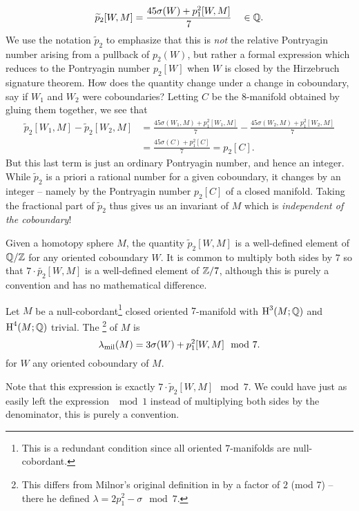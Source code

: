 \[
\widetilde{p}_2[W, M] = \frac{45\sigma(W) + p_1^2[W, M]}{7} \quad\in\mathbb{Q}.
\]
We use the notation $\widetilde{p}_2$ to emphasize that this is \emph{not} the relative Pontryagin number arising from a pullback of $p_2(W)$, but rather a formal expression which reduces to the Pontryagin number $p_2[W]$ when $W$ is closed by the Hirzebruch signature theorem.
How does the quantity change under a change in coboundary, say if $W_1$ and $W_2$ were coboundaries? Letting $C$ be the $8$-manifold obtained by gluing them together, we see that
\[
	\begin{aligned}
	\widetilde{p}_2[W_1,M] - \widetilde{p}_2[W_2,M]
		 & = \frac{45\sigma(W_1,M) + p_1^2[W_1,M]}{7} - \frac{45\sigma(W_2, M) + p_1^2[W_2,M]}{7} \\
		 & =\frac{45\sigma(C) + p_1^2[C]}{7} = p_2[C].
	\end{aligned}
\]
But this last term is just an ordinary Pontryagin number, and hence an integer. While $\widetilde{p}_2$ is a priori a rational number for a given coboundary, it changes by an integer -- namely by the Pontryagin number $p_2[C]$ of a closed manifold.
Taking the fractional part of $\widetilde{p}_2$ thus gives us an invariant of $M$ which is \emph{independent of the coboundary}!

\begin{remark*}
Given a homotopy sphere $M$, the quantity $\widetilde{p}_2[W,M]$ is a well-defined element of $\mathbb{Q}/\mathbb{Z}$ for any oriented coboundary $W$. It is common to multiply both sides by $7$ so that $7\cdot \widetilde{p_2}[W,M]$ is a well-defined element of $\mathbb{Z}/7$, although this is purely a convention and has no mathematical difference.
\end{remark*}

\begin{definition}\label{def:milnor-invariant-7}
	Let $M$ be a null-cobordant\footnote{This is a redundant condition since all oriented $7$-manifolds are null-cobordant.}
	closed oriented $7$-manifold with $\operatorname{H}^3(M; \mathbb{Q})$ and $\operatorname{H}^4(M; \mathbb{Q})$ trivial. The \footnote{This differs from Milnor's original definition in \cite{milnor1956manifolds} by a factor of $2$ (mod 7) -- there he defined $\lambda=2p_1^2-\sigma \mod 7$.} of $M$ is
	\[
		\lambda_{\mathrm{mil}}(M) = 3\sigma(W)+p_1^2[W,M]\mod 7.
	\]
	for $W$ any oriented coboundary of $M$.
\end{definition}

\begin{remark*}
	Note that this expression is exactly $7\cdot \widetilde{p}_2[W,M]\mod 7$. We could have just as easily left the expression $\mod 1$ instead of multiplying both sides by the denominator, this is purely a convention.
\end{remark*}

